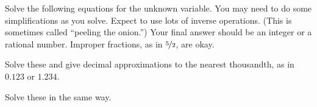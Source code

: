 
Solve the following equations for the unknown variable.
You may need to do some simplifications as you solve.
Expect to use lots of inverse operations.
(This is sometimes called ``peeling the onion.'')
Your final answer should be an integer or a rational number.
Improper fractions, as in $\nicefrac{5}{2}$, are okay.

\begin{multicols}{2}
 \begin{ProblemSet}[pencil space=3.5in]


 \end{ProblemSet}
\end{multicols}

\newpage

Solve these and give decimal approximations to the nearest thousandth, as in $0.123$ or $1.234$.

\begin{ProblemSet}[pencil space=3.5in]
\end{ProblemSet}


\newpage
{}

Solve these in the same way.

\begin{multicols}{2}
 \begin{ProblemSet}[pencil space=0in]


 \end{ProblemSet}
\end{multicols}

